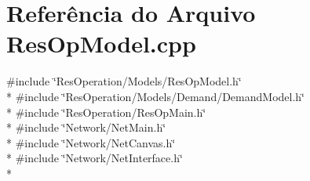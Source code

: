 \section{Referência do Arquivo Res\+Op\+Model.\+cpp}
\label{_res_op_model_8cpp}
{\ttfamily \#include \char`\"{}Res\+Operation/\+Models/\+Res\+Op\+Model.\+h\char`\"{}}\\*
{\ttfamily \#include \char`\"{}Res\+Operation/\+Models/\+Demand/\+Demand\+Model.\+h\char`\"{}}\\*
{\ttfamily \#include \char`\"{}Res\+Operation/\+Res\+Op\+Main.\+h\char`\"{}}\\*
{\ttfamily \#include \char`\"{}Network/\+Net\+Main.\+h\char`\"{}}\\*
{\ttfamily \#include \char`\"{}Network/\+Net\+Canvas.\+h\char`\"{}}\\*
{\ttfamily \#include \char`\"{}Network/\+Net\+Interface.\+h\char`\"{}}\\*
